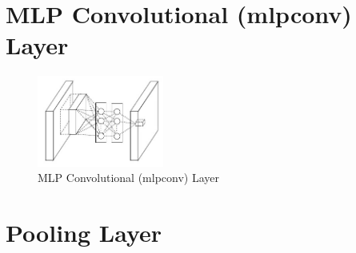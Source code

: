
\section{MLP Convolutional (mlpconv) Layer \cite{medium/towardsdatascience.com/review-nin-network-in-network-image-classification-69e271e499ee}}

\begin{figure}[H]
    \centering
    \includegraphics[width=\linewidth, height=3cm, keepaspectratio]{Pictures/layers/conv-layer-mlp.jpg}
    \caption{MLP Convolutional (mlpconv) Layer}
\end{figure}




\section{Pooling Layer \cite{gfg-convolutional-neural-network-cnn-in-machine-learning,dnn-1}}\label{nn: Pooling Layer}

